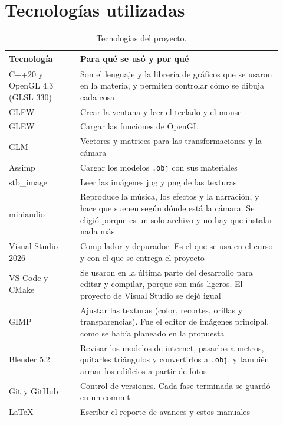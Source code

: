 \documentclass[11pt,a4paper]{article}
\begin{document}
\section{Tecnologías utilizadas}

\begin{table}[H]
  \centering
  \small
  \begin{tabular}{|p{0.24\linewidth}|p{0.68\linewidth}|}
    \hline
    \textbf{Tecnología} & \textbf{Para qué se usó y por qué} \\ \hline
    C++20 y OpenGL 4.3 (GLSL 330) & Son el lenguaje y la librería de gráficos que se usaron en la materia, y permiten controlar cómo se dibuja cada cosa \\ \hline
    GLFW & Crear la ventana y leer el teclado y el mouse \\ \hline
    GLEW & Cargar las funciones de OpenGL \\ \hline
    GLM & Vectores y matrices para las transformaciones y la cámara \\ \hline
    Assimp & Cargar los modelos \texttt{.obj} con sus materiales \\ \hline
    stb\_image & Leer las imágenes jpg y png de las texturas \\ \hline
    miniaudio & Reproduce la música, los efectos y la narración, y hace que suenen según dónde está la cámara. Se eligió porque es un solo archivo y no hay que instalar nada más \\ \hline
    Visual Studio 2026 & Compilador y depurador. Es el que se usa en el curso y con el que se entrega el proyecto \\ \hline
    VS Code y CMake & Se usaron en la última parte del desarrollo para editar y compilar, porque son más ligeros. El proyecto de Visual Studio se dejó igual \\ \hline
    GIMP & Ajustar las texturas (color, recortes, orillas y transparencias). Fue el editor de imágenes principal, como se había planeado en la propuesta \\ \hline
    Blender 5.2 & Revisar los modelos de internet, pasarlos a metros, quitarles triángulos y convertirlos a \texttt{.obj}, y también armar los edificios a partir de fotos \\ \hline
    Git y GitHub & Control de versiones. Cada fase terminada se guardó en un commit \\ \hline
    LaTeX & Escribir el reporte de avances y estos manuales \\ \hline
  \end{tabular}
  \caption{Tecnologías del proyecto.}
\end{table}
\end{document}
